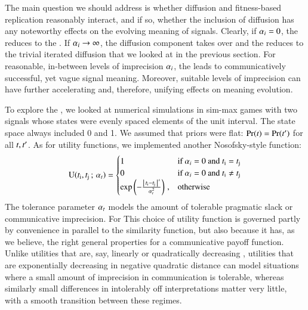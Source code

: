 The main question we should address is whether diffusion and
fitness-based replication reasonably interact, and if so, whether the
inclusion of diffusion has any noteworthy effects on the evolving
meaning of signals. Clearly, if $\alpha_i = 0$, the \rdd reduces to
the \rd. If $\alpha_i \rightarrow \infty$, the diffusion component
takes over and the \rdd reduces to the trivial iterated diffusion that
we looked at in the previous section. For reasonable, in-between
levels of imprecision $\alpha_i$, the \rdd leads to communicatively
successful, yet vague signal meaning. Moreover, suitable levels of
imprecision can have further accelerating and, therefore, unifying
effects on meaning evolution.

To explore the \rdd, we looked at numerical simulations in sim-max
games with two signals whose states were evenly spaced elements of the
unit interval. The state space always included 0 and 1. We assumed
that priors were flat: $\Pr(t) = \Pr(t')$ for all $t,
t'$. As for utility functions, we implemented another
Nosofsky-style function:
\begin{align}
  \label{eq:NosofskyUtil}
  \mathrm{U}(t_{\mathrm{i}}, t_{\mathrm{j}} \thinspace ; \thinspace \alpha_t) =
      \begin{cases}
    1 & \textrm{if } \alpha_i = 0 \textrm{ and } t_{\mathrm{i}} = t_{\mathrm{j}} \\
    0 & \textrm{if } \alpha_i = 0 \textrm{ and } t_{\mathrm{i}} \neq t_{\mathrm{j}} \\
 \operatorname{exp} \left ( -  \frac{\left \lvert \, t_{\mathrm{i}} - t_{\mathrm{j}} \, \right\rvert^s}{ \alpha_t^2} \right ) \,,& \textrm{otherwise} \\
    \end{cases}
\end{align}
The tolerance parameter $\alpha_t$ models the amount of tolerable
pragmatic slack or communicative imprecision. For This choice of
utility function is governed partly by convenience in parallel to the
similarity function, but also because it has, as we believe, the right
general properties for a communicative payoff function. Unlike
utilities that are, say, linearly or quadratically decreasing
\citep[as used
by][]{JagerMetzger2011:Voronoi-Languag,FrankeJager2010:Vagueness-Signa},
utilities that are exponentially decreasing in negative quadratic
distance can model situations where a small amount of imprecision in
communication is tolerable, whereas similarly small differences in
intolerably off interpretations matter very little, with a smooth
transition between these regimes.

